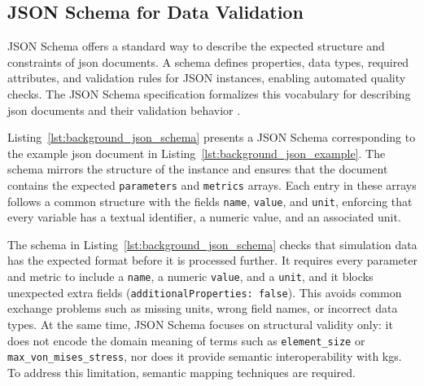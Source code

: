 \subsection{JSON Schema for Data Validation}
\label{sec:background:json_jsonschema}

JSON Schema offers a standard way to describe the expected structure and constraints of \gls{json} documents. A schema defines properties, data types, required attributes, and validation rules for JSON instances, enabling automated quality checks. The JSON Schema specification formalizes this vocabulary for describing \gls{json} documents and their validation behavior \cite{wright2020jsonschema}. 

Listing~\ref{lst:background_json_schema} presents a JSON Schema corresponding to the example \gls{json} document in Listing~\ref{lst:background_json_example}. The schema mirrors the structure of the instance and ensures that the document contains the expected \texttt{parameters} and \texttt{metrics} arrays. Each entry in these arrays follows a common structure with the fields \texttt{name}, \texttt{value}, and \texttt{unit}, enforcing that every variable has a textual identifier, a numeric value, and an associated unit.

The schema in Listing~\ref{lst:background_json_schema} checks that simulation data has the expected format before it is processed further. It requires every parameter and metric to include a \texttt{name}, a numeric \texttt{value}, and a \texttt{unit}, and it blocks unexpected extra fields (\texttt{additionalProperties: false}). This avoids common exchange problems such as missing units, wrong field names, or incorrect data types. At the same time, JSON Schema focuses on structural validity only: it does not encode the domain meaning of terms such as \texttt{element\_size} or \texttt{max\_von\_mises\_stress}, nor does it provide semantic interoperability with \glspl{kg}. To address this limitation, semantic mapping techniques are required.

